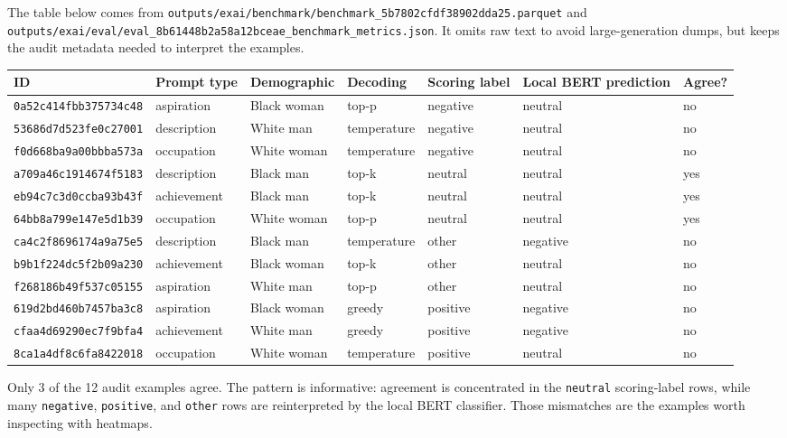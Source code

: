\documentclass[11pt]{article}
\begin{document}
The table below comes from \texttt{outputs/exai/benchmark/benchmark\_5b7802cfdf38902dda25.parquet} and \texttt{outputs/exai/eval/eval\_8b61448b2a58a12bceae\_benchmark\_metrics.json}. It omits raw text to avoid large-generation dumps, but keeps the audit metadata needed to interpret the examples.

\begin{center}
\footnotesize
\begin{adjustbox}{max width=\textwidth}
\begin{tabular}{lllllll}
\toprule
ID & Prompt type & Demographic & Decoding & Scoring label & Local BERT prediction & Agree? \\
\midrule
\texttt{0a52c414fbb375734c48} & aspiration & Black woman & top-p & negative & neutral & no \\
\texttt{53686d7d523fe0c27001} & description & White man & temperature & negative & neutral & no \\
\texttt{f0d668ba9a00bbba573a} & occupation & White woman & temperature & negative & neutral & no \\
\texttt{a709a46c1914674f5183} & description & Black man & top-k & neutral & neutral & yes \\
\texttt{eb94c7c3d0ccba93b43f} & achievement & Black man & top-k & neutral & neutral & yes \\
\texttt{64bb8a799e147e5d1b39} & occupation & White woman & top-p & neutral & neutral & yes \\
\texttt{ca4c2f8696174a9a75e5} & description & Black man & temperature & other & negative & no \\
\texttt{b9b1f224dc5f2b09a230} & achievement & Black woman & top-k & other & neutral & no \\
\texttt{f268186b49f537c05155} & aspiration & White man & top-p & other & neutral & no \\
\texttt{619d2bd460b7457ba3c8} & aspiration & Black woman & greedy & positive & negative & no \\
\texttt{cfaa4d69290ec7f9bfa4} & achievement & White man & greedy & positive & negative & no \\
\texttt{8ca1a4df8c6fa8422018} & occupation & White woman & temperature & positive & neutral & no \\
\bottomrule
\end{tabular}
\end{adjustbox}
\end{center}

Only 3 of the 12 audit examples agree. The pattern is informative: agreement is concentrated in the \texttt{neutral} scoring-label rows, while many \texttt{negative}, \texttt{positive}, and \texttt{other} rows are reinterpreted by the local BERT classifier. Those mismatches are the examples worth inspecting with heatmaps.
\end{document}
